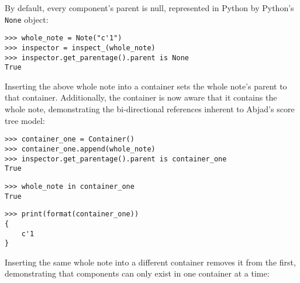 \noindent By default, every component's parent is null, represented in Python
by Python's \texttt{None} object:

\begin{comment}
<abjad>
whole_note = Note("c'1")
inspector = inspect_(whole_note)
inspector.get_parentage().parent is None
</abjad>
\end{comment}

\begin{abjadbookoutput}
\begin{singlespacing}
\vspace{-0.5\baselineskip}
\begin{verbatim}
>>> whole_note = Note("c'1")
>>> inspector = inspect_(whole_note)
>>> inspector.get_parentage().parent is None
True
\end{verbatim}
\end{singlespacing}
\end{abjadbookoutput}

\noindent Inserting the above whole note into a container sets the whole note's
parent to that container. Additionally, the container is now aware that it
contains the whole note, demonstrating the bi-directional references inherent
to Abjad's score tree model:

\begin{comment}
<abjad>
container_one = Container()
container_one.append(whole_note)
inspector.get_parentage().parent is container_one
whole_note in container_one
print(format(container_one))
</abjad>
\end{comment}

\begin{abjadbookoutput}
\begin{singlespacing}
\vspace{-0.5\baselineskip}
\begin{verbatim}
>>> container_one = Container()
>>> container_one.append(whole_note)
>>> inspector.get_parentage().parent is container_one
True
\end{verbatim}
\begin{verbatim}
>>> whole_note in container_one
True
\end{verbatim}
\begin{verbatim}
>>> print(format(container_one))
{
    c'1
}
\end{verbatim}
\end{singlespacing}
\end{abjadbookoutput}

\noindent Inserting the same whole note into a different container removes it
from the first, demonstrating that components can only exist in one container
at a time:

